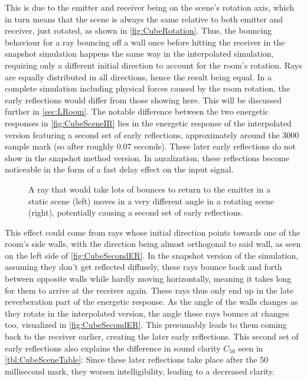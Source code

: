 This is due to the emitter and receiver being on the scene's rotation axis,
which in turn means that the scene is always the same relative to both emitter and receiver, just rotated,
as shown in \autoref{fig:CubeRotation}.
\newline
Thus, the bouncing behaviour for a ray bouncing off a wall once before hitting the receiver
in the snapshot simulation happens the same way in the interpolated simulation,
requiring only a different initial direction to account for the room's rotation.
Rays are equally distributed in all directions, hence the result being equal.
\newline
In a complete simulation including physical forces caused by the room rotation,
the early reflections would differ from those showing here.
This will be discussed further in \autoref{sec:LRoom}.
\newline
The notable difference between the two energetic responses in \autoref{fig:CubeSceneIR}
lies in the energetic response of the interpolated version featuring a second set of early reflections,
approximately around the 3000 sample mark (so after roughly 0.07 seconds).
These later early reflections do not show in the snapshot method version.
In auralization, these reflections become noticeable in the form of a fast delay effect on the input signal.
\newline
\begin{figure}[t!]
    \begin{center}
        
    \end{center}
    \caption[The difference in early bouncing behaviour between a static and rotating scene.]{A ray that would take lots of bounces to return to the emitter in a static scene (left) moves in a very different angle in a rotating scene (right), potentially causing a second set of early reflections.}\label{fig:CubeSecondER}
\end{figure}
This effect could come from rays whose initial direction points towards one of the room's side walls,
with the direction being almost orthogonal to said wall, as seen on the left side of \autoref{fig:CubeSecondER}.
In the snapshot version of the simulation, assuming they don't get reflected diffusely,
these rays bounce back and forth between opposite walls while hardly moving horizontally,
meaning it takes long for them to arrive at the receiver again.
These rays thus only end up in the late reverberation part of the energetic response.
\newline
As the angle of the walls changes as they rotate in the interpolated version,
the angle these rays bounce at changes too, visualized in \autoref{fig:CubeSecondER}.
This presumably leads to them coming back to the receiver earlier, creating the later early reflections.
\newline
This second set of early reflections also explains the difference in sound clarity \(C_{50}\) seen in \autoref{tbl:CubeSceneTable}:
Since these later reflections take place after the 50 millisecond mark,
they worsen intelligibility, leading to a decreased clarity.

